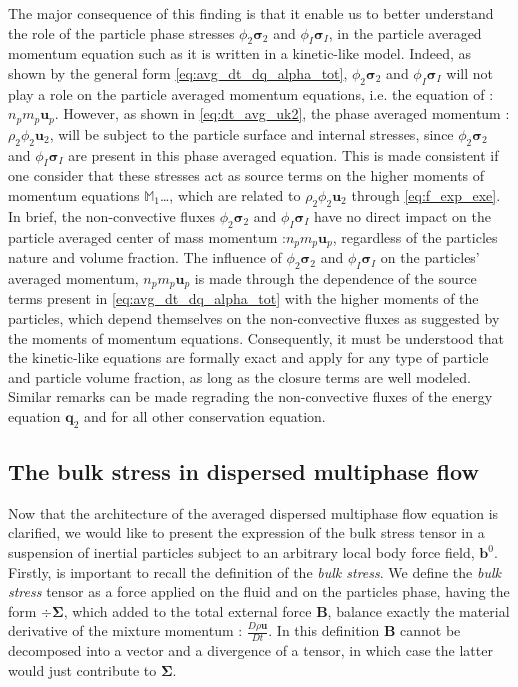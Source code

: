 The major consequence of this finding is that it enable us to better understand the role of the particle phase stresses $\phi_2\bm{\sigma}_2$ and $\phi_I\bm{\sigma}_I$, in the particle averaged momentum equation such as it is written in a kinetic-like model. 
Indeed, as shown by the general form \ref{eq:avg_dt_dq_alpha_tot}, $\phi_2\bm{\sigma}_2$ and $\phi_I\bm{\sigma}_I$ will not play a role on the particle averaged momentum equations, i.e. the equation of : $n_p m_p \textbf{u}_p$. 
However, as shown in \ref{eq:dt_avg_uk2}, the phase averaged momentum : $\rho_2 \phi_2 \textbf{u}_2$,  will be subject to the particle surface and internal stresses, since $\phi_2\bm{\sigma}_2$ and $\phi_I\bm{\sigma}_I$ are present in this phase averaged equation.
This is made consistent if one consider that these stresses act as source terms on the higher moments of momentum equations $\mathbb{M}_1$\ldots, which are related to $\rho_2 \phi_2 \textbf{u}_2$ through \ref{eq:f_exp_exe}. 
In brief, the non-convective fluxes $\phi_2\bm{\sigma}_2$ and $\phi_I\bm{\sigma}_I$  have no direct impact on the particle averaged center of mass momentum :$n_pm_p\textbf{u}_p$, regardless of the particles nature and volume fraction. 
The influence of $\phi_2\bm{\sigma}_2$ and $\phi_I\bm{\sigma}_I$ on the particles' averaged momentum, $n_p m_p \textbf{u}_p$ is made through the dependence of the source terms present in \ref{eq:avg_dt_dq_alpha_tot} with the higher moments of the particles, which depend themselves on the non-convective fluxes as suggested by the moments of momentum equations. 
Consequently, it must be understood that the kinetic-like equations are formally exact and apply for any type of particle and particle volume fraction, as long as the closure terms are well modeled. 
Similar remarks can be made regrading the non-convective fluxes of the energy equation $\textbf{q}_2$ and for all other conservation equation. 

\subsection{The bulk stress in dispersed multiphase flow}

Now that the architecture of the averaged dispersed multiphase flow equation is clarified, we would like to present the expression of the bulk stress tensor in a suspension of inertial particles subject to an arbitrary local body force field, $\textbf{b}^0$.
Firstly, is important to recall the definition of the \textit{bulk stress}. 
We define the \textit{bulk stress} tensor as a force applied on the fluid and on the particles phase, having the form $\div \bm{\Sigma}$, which added to the total external force $\textbf{B}$, balance exactly the material derivative of the mixture momentum : $\frac{D \rho \textbf{u}}{Dt}$. 
In this definition $\textbf{B}$ cannot be decomposed into a vector and a divergence of a tensor, in which case the latter would just contribute to $\bm{\Sigma}$.

